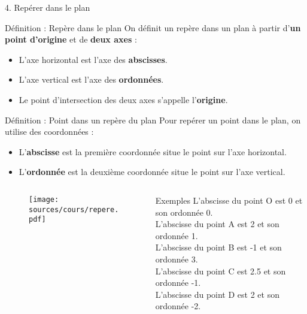 \documentclass{beamer}
\begin{document}
\begin{frame}
  4. Repérer dans le plan
  \begin{alertblock}{Définition : Repère dans le plan}	
    On définit un repère dans un plan à partir d'\textbf{un point d'origine} et de \textbf{deux axes} :
    \begin{itemize}
    \item L'axe horizontal est l'axe des \textbf{abscisses}.
    \item L'axe vertical est l'axe des \textbf{ordonnées}.
    \item Le point d'intersection des deux axes s'appelle l'\textbf{origine}.
    \end{itemize}
  \end{alertblock}
  
  \begin{alertblock}{Définition : Point dans un repère du plan}	
    Pour repérer un point dans le plan, on utilise des coordonnées :
    \begin{itemize}
    \item L'\textbf{abscisse} est la première coordonnée situe le point sur l'axe horizontal.
    \item L'\textbf{ordonnée} est la deuxième coordonnée situe le point sur l'axe vertical.
    \end{itemize}
  \end{alertblock}
\end{frame}

\begin{frame}
  \begin{columns}[t]
    \begin{column}{5cm}
      \begin{figure}[h!]
        \centering
        \texttt{[image: sources/cours/repere.pdf]}
      \end{figure}
    \end{column}
    \begin{column}{5cm}
      \begin{block}{Exemples}	
        L'abscisse du point O est 0 et son ordonnée 0.\\
        L'abscisse du point A est 2 et son ordonnée 1.\\
        L'abscisse du point B est -1 et son ordonnée 3.\\
        L'abscisse du point C est 2.5 et son ordonnée -1.\\
        L'abscisse du point D est 2 et son ordonnée -2.\\

      \end{block}
    \end{column}
  \end{columns} 


\end{frame}
\end{document}
